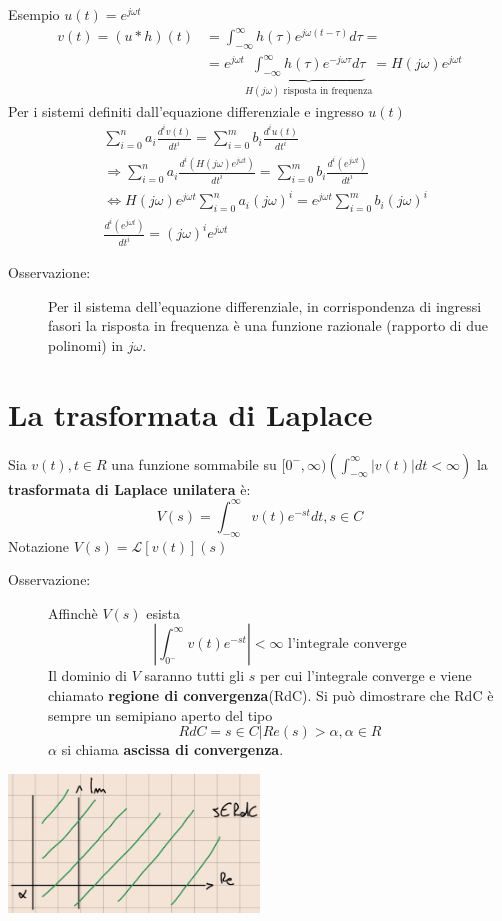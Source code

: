\documentclass[a4paper, 12pt]{book}
\theoremstyle{plain}
\begin{document}
Esempio $u(t) = e^{j \omega t}$
\[
    \begin{split}
        v(t) = (u \ast h) (t) &= \int_{-\infty}^\infty h(\tau)  e^{j \omega (t - \tau)} d \tau = \\
        &= e^{j \omega t} \underbrace{\int_{-\infty}^\infty h(\tau)  e^{-j \omega \tau} d \tau}_{H(j \omega) \textrm{ risposta in frequenza}} = H(j \omega) e^{j \omega t}
    \end{split}
\]
Per i sistemi definiti dall'equazione differenziale e ingresso $u(t)$
\[
    \begin{split}
        &\sum_{i = 0}^n a_i \frac{d^iv(t)}{dt^i} = \sum_{i = 0}^m b_i \frac{d^iu(t)}{dt^i} \\
        &\Rightarrow \sum_{i = 0}^n a_i \frac{d^i (H(j \omega) e^{j \omega t})}{dt^i} = \sum_{i = 0}^m b_i \frac{d^i (e^{j \omega t})}{dt^i} \\
        &\Leftrightarrow H(j \omega) e^{j \omega t} \sum_{i = 0}^n a_i (j \omega)^i =  e^{j \omega t} \sum_{i = 0}^m b_i (j \omega)^i \\
        &\frac{d^i (e^{j \omega t})}{dt^i} = (j \omega)^i e^{j \omega t}
    \end{split}
\]
\begin{description}
    \item[Osservazione:] Per il sistema dell'equazione differenziale, in corrispondenza di ingressi fasori la risposta in 
    frequenza è una funzione razionale (rapporto di due polinomi) in $j\omega$. 
\end{description}

\section{La trasformata di Laplace}

Sia $v(t), t \in R$ una funzione sommabile su $[0^-, \infty)(\int_{-\infty}^\infty |v(t)| dt < \infty)$ la \textbf{trasformata 
di Laplace unilatera} è:
\[
    V(s) = \int_{-\infty}^\infty v(t) e^{-st} dt, s \in C
\]
Notazione $V(s) = \mathcal{L} [v(t)](s)$
\begin{description}
    \item[Osservazione:] Affinchè $V(s)$ esista \[ |\int_{0^-}^\infty v(t) e^{-st}| < \infty \textrm{ l'integrale converge} \] 
    Il dominio di $V$ saranno tutti gli $s$ per cui l'integrale converge e viene chiamato \textbf{regione di convergenza}(RdC).
    Si può dimostrare che RdC è sempre un semipiano aperto del tipo \[ RdC = {s \in C | Re(s) > \alpha}, \alpha \in R \] $\alpha$ 
    si chiama \textbf{ascissa di convergenza}.  
\end{description}
\begin{center}
    \includegraphics[width=0.5\textwidth]{RdC.png}
\end{center}
\end{document}
